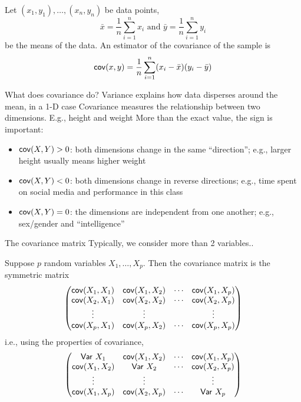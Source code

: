 \documentclass[aspectratio=169]{beamer}\usepackage[]{graphicx}\usepackage[]{xcolor}
\begin{document}
\begin{frame}
\begin{definition}
Let $(x_1,y_1),\ldots,(x_n,y_n)$ be data points,
\[
\bar x = \frac 1n \sum_{i=1}^n x_i
\textrm{ and }
\bar y = \frac 1n \sum_{i=1}^n y_i
\]
be the means of the data. An estimator of the covariance of the sample is
\[
\mathsf{cov}(x,y) = \frac{1}{n}\sum_{i=1}^n (x_i-\bar x)(y_i-\bar y)
\]
\end{definition}
\end{frame}

\begin{frame}{What does covariance do?}
Variance explains how data disperses around the mean, in a 1-D case
\vfill
Covariance measures the relationship between two dimensions. E.g., height and weight
\vfill
More than the exact value, the sign is important:
\begin{itemize}
    \item $\mathsf{cov}(X,Y)>0$: both dimensions change in the same ``direction''; e.g., larger height usually means higher weight
    \item $\mathsf{cov}(X,Y)<0$: both dimensions change in reverse directions; e.g., time spent on social media and performance in this class
    \item $\mathsf{cov}(X,Y)=0$: the dimensions are independent from one another; e.g., sex/gender and ``intelligence''
\end{itemize}
\end{frame}

\begin{frame}{The covariance matrix}
Typically, we consider more than 2 variables.. 
\begin{definition}
Suppose $p$ random variables $X_1,\ldots,X_p$. Then the covariance matrix is the symmetric matrix
\[
\begin{pmatrix}
\mathsf{cov}(X_1,X_1) & \mathsf{cov}(X_1,X_2) & \cdots & \mathsf{cov}(X_1,X_p) \\
\mathsf{cov}(X_2,X_1) & \mathsf{cov}(X_2,X_2) & \cdots & \mathsf{cov}(X_2,X_p) \\
\vdots & \vdots & & \vdots \\
\mathsf{cov}(X_p,X_1) & \mathsf{cov}(X_p,X_2) & \cdots & \mathsf{cov}(X_p,X_p) 
\end{pmatrix}
\]
i.e., using the properties of covariance,
\[
\begin{pmatrix}
\mathsf{Var}\  X_1 & \mathsf{cov}(X_1,X_2) & \cdots & \mathsf{cov}(X_1,X_p) \\
\mathsf{cov}(X_1,X_2) & \mathsf{Var}\  X_2 & \cdots & \mathsf{cov}(X_2,X_p) \\
\vdots & \vdots & & \vdots \\
\mathsf{cov}(X_1,X_p) & \mathsf{cov}(X_2,X_p) & \cdots & \mathsf{Var}\  X_p 
\end{pmatrix}
\]
\end{definition}
\end{frame}
\end{document}
